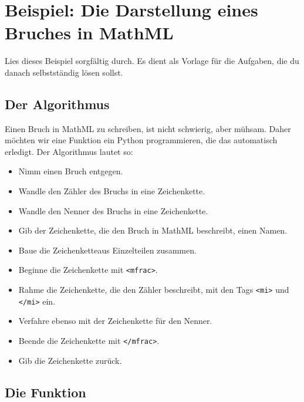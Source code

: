 \section{Beispiel: Die Darstellung eines Bruches in MathML}

Lies dieses Beispiel sorgfältig durch. Es dient als Vorlage für die Aufgaben, die du danach selbstständig lösen sollst.

\subsection{Der Algorithmus}

Einen Bruch in MathML zu schreiben, ist nicht schwierig, aber mühsam. Daher möchten wir eine Funktion ein Python programmieren, die das automatisch erledigt. Der Algorithmus lautet so:
\begin{itemize}
	\item Nimm einen Bruch entgegen.
	\item Wandle den Zähler des Bruchs in eine Zeichenkette.
	\item Wandle den Nenner des Bruchs in eine Zeichenkette.
	\item Gib der Zeichenkette, die den Bruch in MathML beschreibt, einen Namen.
	\item Baue die Zeichenketteaus Einzelteilen zusammen.
	\item Beginne die Zeichenkette mit \texttt{<mfrac>}.
	\item Rahme die Zeichenkette, die den Zähler beschreibt, mit den Tags \texttt{<mi>} und \texttt{</mi>} ein.
	\item Verfahre ebenso mit der Zeichenkette für den Nenner.
	\item Beende die Zeichenkette mit \texttt{</mfrac>}.
	\item Gib die Zeichenkette zurück.
\end{itemize}

\subsection{Die Funktion}
